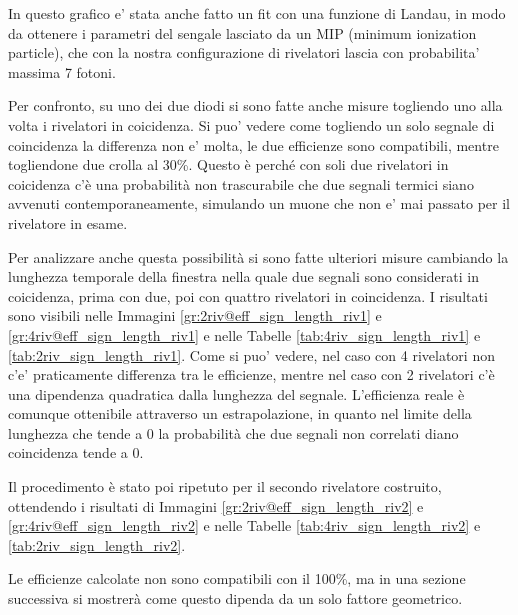 
In questo grafico e' stata anche fatto un fit con una funzione di Landau, in modo da ottenere i parametri del sengale lasciato da un MIP (minimum ionization particle), che con la nostra configurazione di rivelatori lascia con probabilita' massima 7 fotoni.

Per confronto, su uno dei due diodi si sono fatte anche misure togliendo uno alla volta i rivelatori in coicidenza. Si puo' vedere come togliendo un solo segnale di coincidenza la differenza non e' molta, le due efficienze sono compatibili, mentre togliendone due crolla al 30\%. Questo \`e perch\'e con soli due rivelatori in coicidenza c'\`e una probabilit\`a non trascurabile che due segnali termici siano avvenuti contemporaneamente, simulando un muone che non e' mai passato per il rivelatore in esame.

Per analizzare anche questa possibilit\`a si sono fatte ulteriori misure cambiando la lunghezza temporale della finestra nella quale due segnali sono considerati in coicidenza, prima con due, poi con quattro rivelatori in coincidenza. I risultati sono visibili nelle Immagini \ref{gr:2riv@eff_sign_length_riv1} e \ref{gr:4riv@eff_sign_length_riv1} e nelle Tabelle \ref{tab:4riv_sign_length_riv1} e \ref{tab:2riv_sign_length_riv1}.
Come si puo' vedere, nel caso con 4 rivelatori non c'e' praticamente differenza tra le efficienze, mentre nel caso con 2 rivelatori c'\`e una dipendenza quadratica dalla lunghezza del segnale. L'efficienza reale \`e comunque ottenibile attraverso un estrapolazione, in quanto nel limite della lunghezza che tende a 0 la probabilit\`a che due segnali non correlati diano coincidenza tende a 0.

Il procedimento \`e stato poi ripetuto per il secondo rivelatore costruito, ottendendo i risultati di Immagini \ref{gr:2riv@eff_sign_length_riv2} e \ref{gr:4riv@eff_sign_length_riv2} e nelle Tabelle \ref{tab:4riv_sign_length_riv2} e \ref{tab:2riv_sign_length_riv2}.

Le efficienze calcolate non sono compatibili con il 100\%, ma in una sezione successiva si mostrer\`a come questo dipenda da un solo fattore geometrico.
